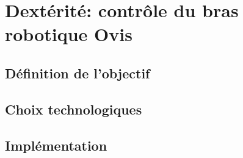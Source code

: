 \chapter{Dextérité: contrôle du bras robotique Ovis}
\label{chap:dexterity}

\section{Définition de l'objectif}


\section{Choix technologiques}


\section{Implémentation}
